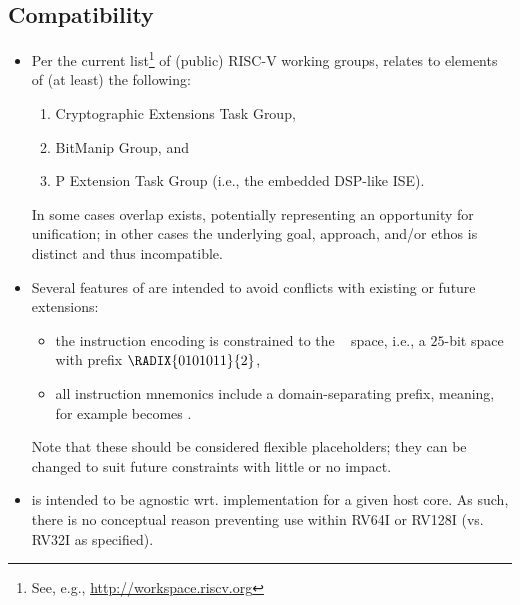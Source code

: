 
\subsection{Compatibility}
\label{sec:bg:compatibility}

\begin{itemize}

\item Per the current list\footnote{
      See, e.g., \url{http://workspace.riscv.org}
      } of (public) RISC-V working groups, 
      \XCID relates to elements of (at least) the following:

      \begin{enumerate}
      \item Cryptographic Extensions Task Group,
      \item BitManip                      Group,
            and
      \item P             Extension  Task Group (i.e., the embedded DSP-like ISE).
      \end{enumerate}

      \noindent
      In some cases overlap exists, potentially representing an opportunity
      for unification; in other cases the underlying goal, approach, and/or
      ethos is distinct and thus incompatible.

\item Several features of \XCID are intended to avoid conflicts with existing 
      or future extensions:

      \begin{itemize}
      \item the instruction encoding is constrained to the 
            ~\cite[Table 19.1]{SCARV:RV:ISA:I:17}
            space, i.e., a $25$-bit space with prefix $\RADIX{0101011}{2}$,
      \item all instruction mnemonics include a domain-separating prefix,
            meaning, for example  becomes .
      \end{itemize}
      
      \noindent
      Note that these should be considered flexible placeholders; they can
      be changed to suit future constraints with little or no impact.

\item \XCID is intended to be agnostic wrt. implementation for a given host 
      core.  As such, there is no conceptual reason preventing use within
      RV64I or RV128I (vs. RV32I as specified).  

\end{itemize}

